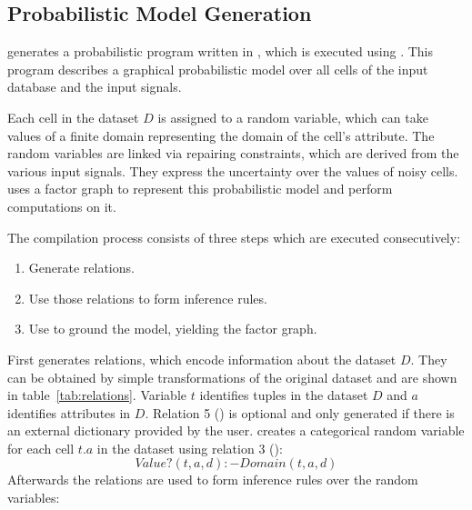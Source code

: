   \subsection{Probabilistic Model Generation}
  \holoclean{} generates a probabilistic program written in \ddlog{}, which is executed using \deepdive{}.
  This program describes a graphical probabilistic model over all cells of the input database and the input signals.
  
  Each cell in the dataset $D$ is assigned to a random variable, which can take values of a finite domain representing the domain of the cell's attribute.
  The random variables are linked via repairing constraints, which are derived from the various input signals.
  They express the uncertainty over the values of noisy cells.
  \holoclean{} uses a factor graph to represent this probabilistic model and perform computations on it.
  
  The compilation process consists of three steps which are executed consecutively:
  \begin{enumerate}
    \item Generate \ddlog{} relations.
    \item Use those relations to form inference rules.
    \item Use \deepdive{} to ground the model, yielding the factor graph.
  \end{enumerate}
    
  First \holoclean{} generates \ddlog{} relations, which encode information about the dataset $D$.
  They can be obtained by simple transformations of the original dataset and are shown in table~\ref{tab:relations}.
  Variable $t$ identifies tuples in the dataset $D$ and $a$ identifies attributes in $D$.
  Relation 5 () is optional and only generated if there is an external dictionary provided by the user.
  \holoclean{} creates a categorical random variable for each cell $t.a$ in the dataset using relation 3 ():
  \begin{equation}
    Value?(t,a,d):-Domain(t,a,d)\label{equ:cells}
  \end{equation}
  Afterwards the \ddlog{} relations are used to form inference rules over the random variables:
  

